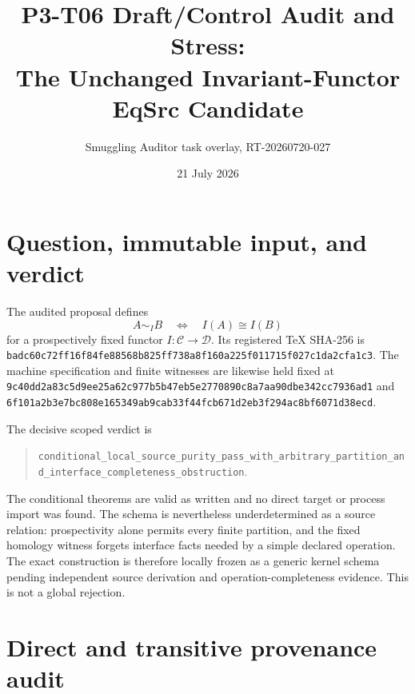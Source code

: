 \documentclass[11pt]{article}
\title{P3-T06 Draft/Control Audit and Stress:\\
The Unchanged Invariant-Functor EqSrc Candidate}
\author{Smuggling Auditor task overlay, RT-20260720-027}
\date{21 July 2026}
\newcommand{\EqI}{\mathrel{\sim_I}}
\begin{document}
\maketitle

\begin{center}
\end{center}

\section{Question, immutable input, and verdict}

The audited proposal defines
\[
 A\EqI B \quad\Longleftrightarrow\quad I(A)\cong I(B)
\]
for a prospectively fixed functor \(I:\mathcal C\to\mathcal D\).  Its
registered TeX SHA-256 is
\texttt{badc60c72ff16f84fe88568b825ff738a8f160a225f011715f027c1da2cfa1c3}.
The machine specification and finite witnesses are likewise held fixed at
\texttt{9c40dd2a83c5d9ee25a62c977b5b47eb5e2770890c8a7aa90dbe342cc7936ad1}
and
\texttt{6f101a2b3e7bc808e165349ab9cab33f44fcb671d2eb3f294ac8bf6071d38ecd}.

The decisive scoped verdict is
\begin{quote}
\texttt{conditional\_local\_source\_purity\_pass\_with\_arbitrary\_partition\_and\_interface\_completeness\_obstruction}.
\end{quote}
The conditional theorems are valid as written and no direct target or process
import was found.  The schema is nevertheless underdetermined as a source
relation: prospectivity alone permits every finite partition, and the fixed
homology witness forgets interface facts needed by a simple declared
operation.  The exact construction is therefore locally frozen as a generic
kernel schema pending independent source derivation and operation-completeness
evidence.  This is not a global rejection.

\section{Direct and transitive provenance audit}
\end{document}
